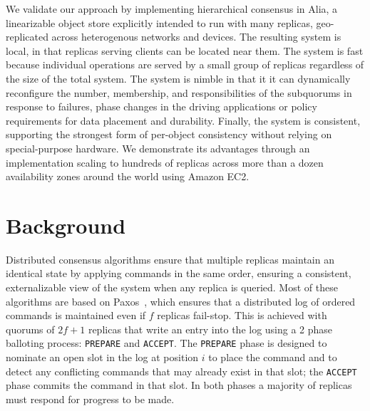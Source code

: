 \documentclass[10pt,conference]{IEEEtran}
\newcommand{\hc}{hierarchical consensus\xspace}
\begin{document}
We validate our approach by implementing \hc in Alia, a linearizable object store
explicitly intended to run with many replicas, geo-replicated across heterogenous
networks and devices.
The resulting system is local, in that replicas serving clients can be located near them.
The system is fast because individual operations are served by a small group of replicas
regardless of the size of the total system.
The system is nimble in that it it can dynamically reconfigure the number, membership,
and responsibilities of the subquorums in response to failures, phase changes in the
driving applications or policy requirements for data placement and durability.
Finally, the system is consistent, supporting the strongest form of per-object
consistency without relying on special-purpose hardware.
We demonstrate its advantages through an implementation scaling to hundreds of replicas
across more than a dozen availability zones around the world using Amazon EC2.



\section{Background}
\label{section:background}

Distributed consensus algorithms ensure that multiple replicas maintain an identical
state by applying commands in the same order, ensuring a consistent, externalizable
view of the system when any replica is queried.
Most of these algorithms are based on Paxos~\cite{paxos_simple}, which ensures that a
distributed log of ordered commands is maintained even if $f$ replicas fail-stop.
This is achieved with quorums of $2f+1$ replicas that write an entry into the log using
a 2 phase balloting process: \texttt{PREPARE} and \texttt{ACCEPT}.
The \texttt{PREPARE} phase is designed to nominate an open slot in the log at position
$i$ to place the command and to detect any conflicting commands that may already
exist in that slot; the \texttt{ACCEPT} phase commits the command in that slot.
In both phases a majority of replicas must respond for progress to be made.
\end{document}
